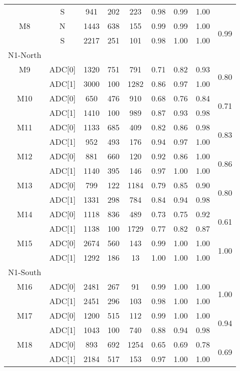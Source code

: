\begin{longtable}{c c c c c c c c c}
     & S & 941 & 202 & 223 & 0.98 & 0.99 & 1.00  & \\
  M8 & N & 1443 & 638 & 155 & 0.99 & 0.99 & 1.00 & \multirow{2}{*}{0.99}\\
     & S & 2217 & 251 & 101 & 0.98 & 1.00 & 1.00 & \\
  \midrule
  N1-North\\
  \midrule
  M9 & ADC[0] & 1320 & 751 & 791 & 0.71 & 0.82 & 0.93 & \multirow{2}{*}{0.80}\\
     & ADC[1] & 3000 & 100 & 1282 & 0.86 & 0.97 & 1.00 &\\
  M10 & ADC[0] & 650 & 476 & 910 & 0.68 & 0.76 & 0.84 & \multirow{2}{*}{0.71}\\
      & ADC[1] & 1410 & 100 & 989 & 0.87 & 0.93 & 0.98 & \\
  M11 & ADC[0] & 1133 & 685 & 409 & 0.82 & 0.86 & 0.98 & \multirow{2}{*}{0.83}\\
      & ADC[1] & 952 & 493 & 176 & 0.94 & 0.97 & 1.00 & \\
  M12 & ADC[0] & 881 & 660 & 120 & 0.92 & 0.86 & 1.00 & \multirow{2}{*}{0.86}\\
      & ADC[1] & 1140 & 395 & 146 & 0.97 & 1.00 & 1.00 &\\
  M13 & ADC[0] & 799 & 122 & 1184 & 0.79 & 0.85 & 0.90 & \multirow{2}{*}{0.80}\\
      & ADC[1] & 1331 & 298 & 784 & 0.84 & 0.94 & 0.98 & \\
  M14 & ADC[0] & 1118 & 836 & 489 & 0.73 & 0.75 & 0.92 & \multirow{2}{*}{0.61}\\
      & ADC[1] & 1138 & 100 & 1729 & 0.77 & 0.82 & 0.87 & \\
  M15 & ADC[0] & 2674 & 560 & 143 & 0.99 & 1.00 & 1.00 & \multirow{2}{*}{1.00}\\
      & ADC[1] & 1292 & 186 & 13 & 1.00 & 1.00 & 1.00\\
  \midrule
  N1-South\\
  \midrule
  M16 & ADC[0] & 2481 & 267 & 91 & 0.99 & 1.00 & 1.00 & \multirow{2}{*}{1.00}\\
      & ADC[1] & 2451 & 296 & 103 & 0.98 & 1.00 & 1.00 &\\
  M17 & ADC[0] & 1200 & 515 & 112 & 0.99 & 1.00 & 1.00 & \multirow{2}{*}{0.94}\\
      & ADC[1] & 1043 & 100 & 740 & 0.88 & 0.94 & 0.98 &\\
  M18 & ADC[0] & 893 & 692 & 1254 & 0.65 & 0.69 & 0.78 & \multirow{2}{*}{0.69}\\
      & ADC[1] & 2184 & 517 & 153 & 0.97 & 1.00 & 1.00 & \\

\end{longtable}
